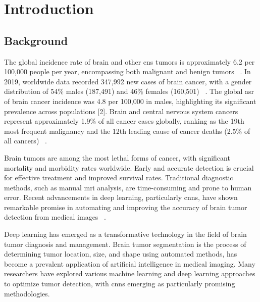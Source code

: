 \newpage
\section{Introduction}
\subsection{Background}
The global incidence rate of brain and other \gls{cns} tumors is approximately 6.2 per 100,000 people per year, encompassing both malignant and benign tumors ~\cite{tisch2024}. In 2019, worldwide data recorded 347,992 new cases of brain cancer, with a gender distribution of 54\% males (187,491) and 46\% females (160,501) ~\cite{ilic2023}. The global \gls{asr} of brain cancer incidence was 4.8 per 100,000 in males, highlighting its significant prevalence across populations [2]. Brain and central nervous system cancers represent approximately 1.9\% of all cancer cases globally, ranking as the 19th most frequent malignancy and the 12th leading cause of cancer deaths (2.5\% of all cancers) ~\cite{ilic2023}.

Brain tumors are among the most lethal forms of cancer, with significant mortality and morbidity rates worldwide. Early and accurate detection is crucial for effective treatment and improved survival rates. Traditional diagnostic methods, such as manual \gls{mri} analysis, are time-consuming and prone to human error.
Recent advancements in deep learning, particularly \gls{cnn}s, have shown remarkable promise in automating and improving the accuracy of brain tumor detection from medical images ~\cite{razzak2018}.

Deep learning has emerged as a transformative technology in the field of brain tumor diagnosis and management. Brain tumor segmentation is the process of determining tumor location, size, and shape using automated methods, has become a prevalent application of artificial intelligence in medical imaging. Many researchers have explored various machine learning and deep learning approaches to optimize tumor detection, with \gls{cnn}s emerging as particularly promising methodologies.


